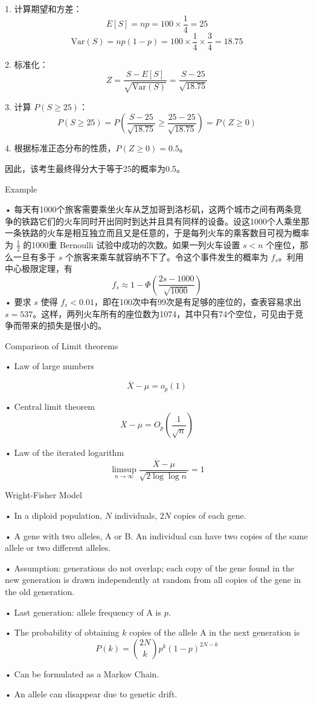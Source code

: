 \documentclass[UTF8]{report}
\theoremstyle{MyLineTheoremStyle} %
\theoremstyle{MyBlockTheoremStyle} %
\theoremstyle{MySubsubsectionStyle} %
\begin{document}
1. 计算期望和方差：
\[
E[S] = np = 100 \times \frac{1}{4} = 25
\]
\[
\text{Var}(S) = np(1-p) = 100 \times \frac{1}{4} \times \frac{3}{4} = 18.75
\]

2. 标准化：
\[
Z = \frac{S - E[S]}{\sqrt{\text{Var}(S)}} = \frac{S - 25}{\sqrt{18.75}}
\]

3. 计算 $P(S \geq 25)$：
\[
P(S \geq 25) = P\left(\frac{S - 25}{\sqrt{18.75}} \geq \frac{25 - 25}{\sqrt{18.75}}\right) = P(Z \geq 0)
\]

4. 根据标准正态分布的性质，$P(Z \geq 0) = 0.5$。

因此，该考生最终得分大于等于25的概率为0.5。\par

\vspace{1cm}

Example\par
• 每天有1000个旅客需要乘坐火车从芝加哥到洛杉矶，这两个城市之间有两条竞争的铁路它们的火车同时开出同时到达并且具有同样的设备。设这1000个人乘坐那一条铁路的火车是相互独立而且又是任意的，于是每列火车的乘客数目可视为概率为 $\frac{1}{2}$ 的1000重 Bernoulli 试验中成功的次数。如果一列火车设置 $s < n$ 个座位，那么一旦有多于 $s$ 个旅客来乘车就容纳不下了。令这个事件发生的概率为 $f_s$。利用中心极限定理，有
\[
f_s \approx 1 - \Phi\left(\frac{2s - 1000}{\sqrt{1000}}\right)
\]
• 要求 $s$ 使得 $f_s < 0.01$，即在100次中有99次是有足够的座位的，查表容易求出 $s = 537$。这样，两列火车所有的座位数为1074，其中只有74个空位，可见由于竞争而带来的损失是很小的。

\vspace{1cm}

Comparison of Limit theorems\par
• Law of large numbers\par
\[
\overline{X} - \mu = o_p(1)
\]\par
• Central limit theorem
\[
\overline{X} - \mu = O_p\left(\frac{1}{\sqrt{n}}\right)
\]\par
• Law of the iterated logarithm
\[
\limsup_{n \to \infty} \frac{\overline{X} - \mu}{\sqrt{2 \log \log n}} = 1
\]

\vspace{1cm}

Wright-Fisher Model\par
• In a diploid population, $N$ individuals, $2N$ copies of each gene.\par
• A gene with two alleles, A or B. An individual can have two copies of the same allele or two different alleles.\par
• Assumption: generations do not overlap; each copy of the gene found in the new generation is drawn independently at random from all copies of the gene in the old generation.\par
• Last generation: allele frequency of A is $p$.\par
• The probability of obtaining $k$ copies of the allele A in the next generation is
\[
P(k) = \binom{2N}{k} p^k (1 - p)^{2N - k}
\]\par
• Can be formulated as a Markov Chain.\par
• An allele can disappear due to genetic drift.\par
\end{document}
